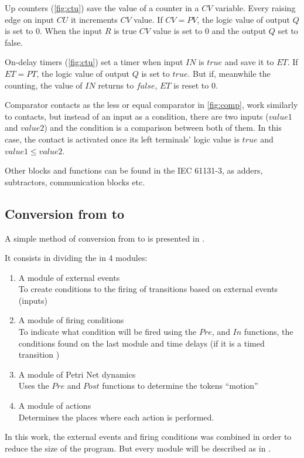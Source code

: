Up counters (\autoref{fig:ctu}) save the value of a counter in a $CV$ variable. Every raising edge
on input $CU$ it increments $CV$ value. If $CV=PV$, the logic value of output $Q$ 
is set to $0$. When the input $R$ is true $CV$ value is set to $0$ and the
output $Q$ set to false.

On-delay timers (\autoref{fig:ctu}) set a timer when input $IN$ is $true$
and save it to $ET$. If $ET=PT$, the logic value of output $Q$ is set to $true$.
But if, meanwhile the counting, the value of $IN$ returns to $false$, $ET$ is reset to
$0$.

Comparator contacts as the less or equal comparator in \autoref{fig:comp}, work
similarly to contacts, but instead of an input as a condition, there are two
inputs ($value1$ and $value2$) and the condition is a comparison between both of
them. In this case, the contact is activated once its left terminals' logic
value is $true$ and $value1\leq value2$.

Other blocks and functions can be found in the IEC 61131-3, as adders,
subtractors, communication blocks etc.

\subsection{Conversion from \CIPN{} to \LD}
\label{sec:cipnToLD}

A simple method of conversion from \CIPN{} to \LD{} is presented in
\cite{moreira2013bridging}.

It consists in dividing the \CIPN{} in 4 modules:
\begin{enumerate}
\item A module of external events\\
  To create conditions to the firing of transitions based on external events
  (inputs)
\item A module of firing conditions\\
  To indicate what condition will be fired using the $Pre$, and $In$ functions, the conditions found on the
  last module and time delays (if it is a timed transition 
  )
\item A module of Petri Net dynamics\\
Uses the $Pre$ and $Post$ functions to determine the tokens ``motion''
\item A module of actions\\
  Determines the places where each action is performed.
\end{enumerate}
In this work, the external events and firing conditions was combined in order to
reduce the size of the program. But every module will be described as in
\cite{moreira2013bridging}.

